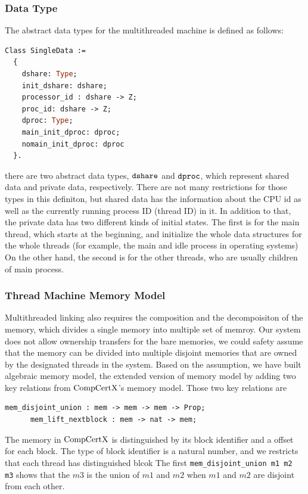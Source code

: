 \subsubsection{Data Type} 
The abstract data types for the multithreaded machine is defined as follows:
\begin{lstlisting}[language=Caml]
Class SingleData :=
  {
    dshare: Type;
    init_dshare: dshare;
    processor_id : dshare -> Z;
    proc_id: dshare -> Z;
    dproc: Type;
    main_init_dproc: dproc;
    nomain_init_dproc: dproc
  }.
\end{lstlisting} 
there are two abstract data types, ${\mathrm{\texttt{dshare}}}$ and ${\mathrm{\texttt{dproc}}}$, 
which represent shared data and private data, respectively. 
There are not many restrictions for those types in this definiton, 
but shared data has the information about the CPU id as well as the currently running process ID (thread ID) in it. 
In addition to that, 
the private data has two different kinds of initial states. 
The first is for the main thread, which starts at the beginning, 
and initialize the whole data structures for the whole  threads (for example, the main and idle process 
in operating systems)
On the other hand, the second is for the other threads, 
who are usually children of main process. 

\subsubsection{Thread Machine Memory Model}


Multithreaded linking also requires the composition and the decompoisiton of the memory,
which divides a single memory into multiple set of memroy. 
Our system does not allow ownership transfers for the bare memories, 
we could safety assume that the memory can be divided into 
multiple disjoint memories that are owned by the designated threads in the system. 
Based on the assumption, 
we have built algebraic memory model, the extended version of memory model by adding two key relations from $\mathrm{CompCertX}$'s memory model.
Those two key relations are 
\begin{lstlisting}[language=Caml]
      mem_disjoint_union : mem -> mem -> mem -> Prop;
      mem_lift_nextblock : mem -> nat -> mem;
\end{lstlisting}
The memory in $\mathrm{CompCertX}$ is 
distinguished by its block identifier and a offset for each block. 
The type of block identifier is a natural number,
and we restricts that each thread has distinguished blcok  
The first \lstinline$mem_disjoint_union m1 m2 m3$  shows that 
the $m3$ is the union of $m1$ and $m2$ when $m1$ and $m2$ 
are disjoint from each other. 

